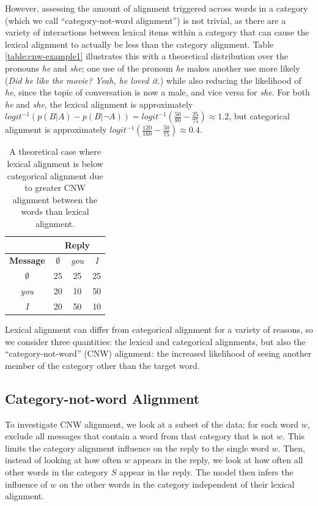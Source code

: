 \documentclass[11pt]{article}
\begin{document}
However, assessing the amount of alignment triggered across words in a category (which we call ``category-not-word alignment'') is not trivial, as there are a variety of interactions between lexical items within a category that can cause the lexical alignment to actually be less than the category alignment. Table \ref{table:cnw-example1} illustrates this with a theoretical distribution over the pronouns \textit{he} and \textit{she}; one use of the pronoun \textit{he} makes another use more likely (\textit{Did he like the movie? Yeah, he loved it.}) while also reducing the likelihood of \textit{he}, since the topic of conversation is now a male, and vice versa for \textit{she}. For both \textit{he} and \textit{she}, the lexical alignment is approximately $logit^{-1}(p(B|A)-p(B|\neg A)) = logit^{-1}(\frac{50}{80}-\frac{25}{75}) \approx 1.2$, but categorical alignment is approximately $logit^{-1}(\frac{120}{160}-\frac{50}{75}) \approx 0.4$.

\begin{table}[h]
\begin{center}
\begin{tabular}{|c||c|c|c|}
\hline
& \multicolumn{3}{|c|}{\bf Reply} \\
\hline
\bf Message & $\emptyset$ & \textit{you} & \textit{I} \\ \hline
$\emptyset$ & 25 & 25 & 25\\
\textit{you} & 20 & 10 & 50 \\
\textit{I} & 20 & 50 & 10 \\
\hline
\end{tabular}
\end{center}
\caption{\label{table:cnw-example2} A theoretical case where lexical alignment is below categorical alignment due to greater CNW alignment between the words than lexical alignment.}
\end{table}

Lexical alignment can differ from categorical alignment for a variety of reasons, so we consider three quantities: the lexical and categorical alignments, but also the ``category-not-word'' (CNW) alignment: the increased likelihood of seeing another member of the category other than the target word.

\subsection{Category-not-word Alignment}

To investigate CNW alignment, we look at a subset of the data: for each word $w$, exclude all messages that contain a word from that category that is not $w$. This limits the category alignment influence on the reply to the single word $w$. Then, instead of looking at how often $w$ appears in the reply, we look at how often all other words in the category $S$ appear in the reply.  The model then infers the influence of $w$ on the other words in the category independent of their lexical alignment.
\end{document}
